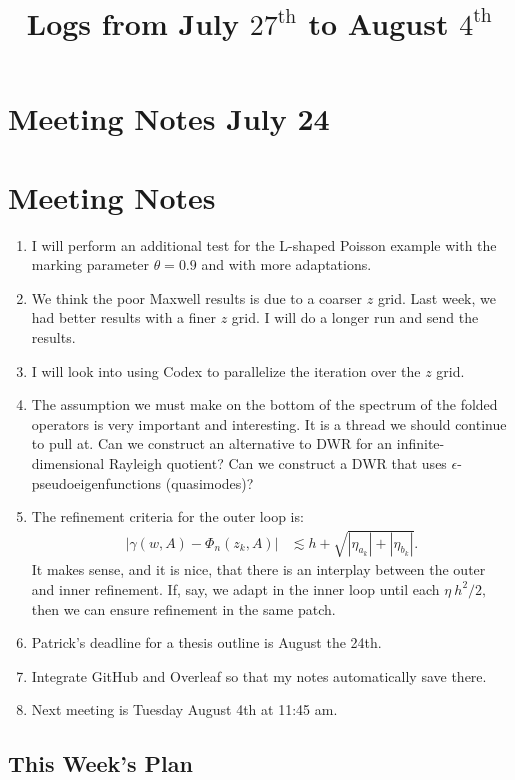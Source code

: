 \documentclass[12pt,a4paper]{article}
\title{Logs from July $27^{\text{th}}$ to August $4^{\text{th}}$}
\author{}
\date{}
\begin{document}
\maketitle

\section{Meeting Notes July 24}

\section{Meeting Notes}
\begin{enumerate}
    \item I will perform an additional test for the L-shaped Poisson example with the marking parameter $\theta = 0.9$ and with more adaptations.
    \item We think the poor Maxwell results is due to a coarser $z$ grid. Last week, we had better results with a finer $z$ grid. I will do a longer run and send the results.
    \item I will look into using Codex to parallelize the iteration over the $z$ grid. 
    \item The assumption we must make on the bottom of the spectrum of the folded operators is very important and interesting. It is a thread we should continue to pull at. Can we construct an alternative to DWR for an infinite-dimensional Rayleigh quotient? Can we construct a DWR that uses $\epsilon$-pseudoeigenfunctions (quasimodes)? 
    \item The refinement criteria for the outer loop is:
    \begin{align}
    | \gamma(w, A) - \Phi_n(z_k, A)|
    & \lesssim h + \sqrt{|\eta_{a_k}| + |\eta_{b_k}|}.
\end{align}
It makes sense, and it is nice, that there is an interplay between the outer and inner refinement. If, say, we adapt in the inner loop until each $\eta ~ h^2/2,$ then we can ensure refinement in the same patch. 
\item Patrick's deadline for a thesis outline is August the 24th. 
\item Integrate GitHub and Overleaf so that my notes automatically save there. 
\item Next meeting is Tuesday August 4th at 11:45 am. 
\end{enumerate}


\subsection{This Week's Plan}
\end{document}
